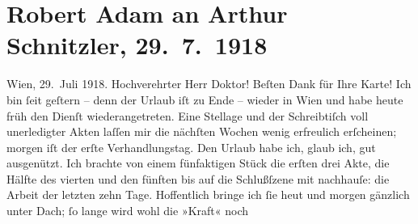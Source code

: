

         
         \renewcommand{\erwaehntePersonen}{Personen:  Molière}
         \renewcommand{\erwaehnteOrte}{Orte: Andorf, Wien}
         \renewcommand{\erwaehnteWerke}{Werke: Robert, Yppl. Idylle in fünf Akten}
               \section[Robert Adam an Arthur Schnitzler, 29. 7. 1918]{ Robert Adam an Arthur Schnitzler, 29. 7. 1918}\nopagebreak{}\rehead{ }\begin{ledgroupsized}[t]{13cm}\normalsize\beginnumbering \toendnotes[C]{\smallbreak\pagebreak[2]} 
\toendnotes[C]{\smallbreak}\pstart
           \raggedleft{}{\pb}Wien, 29. Juli 1918.\pend
           \pstart\center{}Hochverehrter Herr Doktor!\pend\pstart
           Beſten Dank für Ihre Karte!\pend
           \pstart
           Ich bin ſeit geſtern – denn der Urlaub iſt zu Ende – wieder in Wien und habe heute früh den Dienſt wiederangetreten. Eine
               Stellage und der Schreibtiſch voll unerledigter Akten laſſen mir die nächſten Wochen
               wenig erfreulich erſcheinen; morgen iſt der erſte Verhandlungstag.\pend
           \pstart
           Den Urlaub habe ich, glaub ich, gut ausgenützt. Ich brachte von einem fünfaktigen Stück die erſten drei Akte, die
               Hälfte des vierten und den fünften bis auf die Schlußſzene mit nachhauſe: die Arbeit
               der letzten zehn Tage. Hoffentlich bringe ich ſie heut und morgen gänzlich unter
               Dach; ſo lange wird wohl die {\pb}»Kraft« noch

\end{ledgroupsized}
